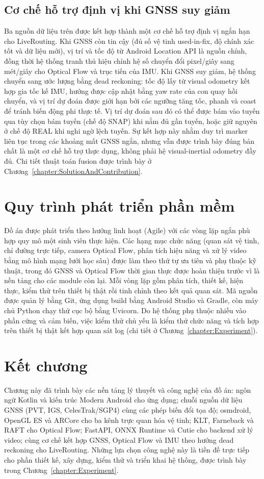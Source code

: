 \documentclass[../DoAn.tex]{subfiles}
\begin{document}
\subsection{Cơ chế hỗ trợ định vị khi GNSS suy giảm}
\label{subsection:3.6.4}
Ba nguồn dữ liệu trên được kết hợp thành một cơ chế hỗ trợ định vị ngắn hạn cho LiveRouting. Khi GNSS còn tin cậy (đủ số vệ tinh used-in-fix, độ chính xác tốt và dữ liệu mới), vị trí và tốc độ từ Android Location API là nguồn chính, đồng thời hệ thống tranh thủ hiệu chỉnh hệ số chuyển đổi pixel/giây sang mét/giây cho Optical Flow và trục tiến của IMU. Khi GNSS suy giảm, hệ thống chuyển sang ước lượng bằng dead reckoning: tốc độ lấy từ visual odometry kết hợp gia tốc kế IMU, hướng được cập nhật bằng yaw rate của con quay hồi chuyển, và vị trí dự đoán được giới hạn bởi các ngưỡng tăng tốc, phanh và coast để tránh biến động phi thực tế. Vị trí dự đoán sau đó có thể được bám vào tuyến qua tùy chọn bám tuyến (chế độ SNAP) khi nằm đủ gần tuyến, hoặc giữ nguyên ở chế độ REAL khi nghi ngờ lệch tuyến. Sự kết hợp này nhằm duy trì marker liên tục trong các khoảng mất GNSS ngắn, nhưng vẫn được trình bày đúng bản chất là một cơ chế hỗ trợ thực dụng, không phải hệ visual-inertial odometry đầy đủ. Chi tiết thuật toán fusion được trình bày ở Chương~\ref{chapter:SolutionAndContribution}.

\section{Quy trình phát triển phần mềm}
\label{section:3.7}
Đồ án được phát triển theo hướng linh hoạt (Agile) với các vòng lặp ngắn phù hợp quy mô một sinh viên thực hiện. Các hạng mục chức năng (quan sát vệ tinh, chỉ đường trực tiếp, camera Optical Flow, phân tích hiệu năng và xử lý video bằng mô hình mạng lưới học sâu) được làm theo thứ tự ưu tiên và phụ thuộc kỹ thuật, trong đó GNSS và Optical Flow thời gian thực được hoàn thiện trước vì là nền tảng cho các module còn lại. Mỗi vòng lặp gồm phân tích, thiết kế, hiện thực, kiểm thử trên thiết bị thật rồi tinh chỉnh theo kết quả quan sát. Mã nguồn được quản lý bằng Git, ứng dụng build bằng Android Studio và Gradle, còn máy chủ Python chạy thử cục bộ bằng Uvicorn. Do hệ thống phụ thuộc nhiều vào phần cứng và cảm biến, việc kiểm thử chủ yếu là kiểm thử chức năng và tích hợp trên thiết bị thật kết hợp quan sát log (chi tiết ở Chương~\ref{chapter:Experiment}).

\section*{Kết chương}
Chương này đã trình bày các nền tảng lý thuyết và công nghệ của đồ án: ngôn ngữ Kotlin và kiến trúc Modern Android cho ứng dụng; chuỗi nguồn dữ liệu GNSS (PVT, IGS, CelesTrak/SGP4) cùng các phép biến đổi tọa độ; osmdroid, OpenGL ES và ARCore cho ba kênh trực quan hóa vệ tinh; KLT, Farneback và RAFT cho Optical Flow; FastAPI, ONNX Runtime và Cutie cho backend xử lý video; cùng cơ chế kết hợp GNSS, Optical Flow và IMU theo hướng dead reckoning cho LiveRouting. Những lựa chọn công nghệ này là tiền đề trực tiếp cho phần thiết kế, xây dựng, kiểm thử và triển khai hệ thống, được trình bày trong Chương~\ref{chapter:Experiment}.
\end{document}
